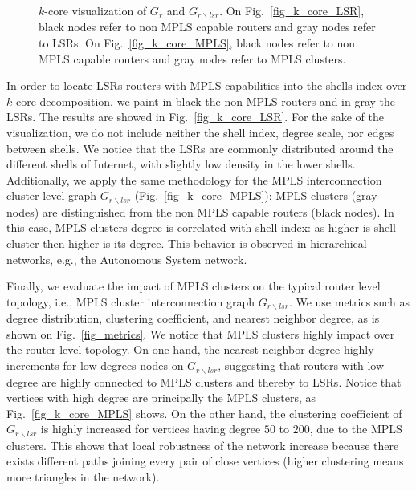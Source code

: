 \begin{figure*}[!t]
  \begin{center}
\hfil
  \end{center}
  \caption{$k$-core visualization of $G_r$ and $G_{r \backslash lsr}$.  On
  Fig.~\ref{fig_k_core_LSR}, black nodes refer to non MPLS capable routers and
  gray nodes refer to LSRs.  On Fig.~\ref{fig_k_core_MPLS}, black nodes refer to
  non MPLS capable routers and gray nodes refer to MPLS clusters.} 
  \label{fig_kcore_overview}
\end{figure*}

In order to locate LSRs-routers with MPLS capabilities into the shells index
over $k$-core decomposition, we paint in black the non-MPLS routers and in gray
the LSRs. The results are showed in Fig.~\ref{fig_k_core_LSR}.  For the sake of
the visualization, we do not include neither the shell index, degree scale, nor
edges between shells. 
We notice that the LSRs are commonly distributed around
the different shells of Internet, with slightly low density in the lower shells.  
Additionally, we apply the same methodology
for the MPLS interconnection cluster level graph $G_{r\backslash lsr}$
(Fig.~\ref{fig_k_core_MPLS}): MPLS clusters (gray nodes) are distinguished from
the non MPLS capable routers (black nodes). 
In this case,  MPLS clusters  degree is correlated with shell index: as higher is shell cluster then higher is its degree.
This behavior is observed in hierarchical networks, e.g., the Autonomous System network. 

Finally, we evaluate the impact of MPLS clusters on the typical router level
topology, i.e., MPLS cluster interconnection graph $G_{r \backslash lsr }$. We
use metrics such as degree distribution, clustering coefficient, and nearest
neighbor degree, as is shown on Fig.~\ref{fig_metrics}.
We notice that MPLS clusters highly impact over the router level topology. On
one hand, the nearest neighbor degree highly increments for low degrees nodes on
$G_{r \backslash lsr }$, suggesting that routers with low degree are highly
connected to MPLS clusters and thereby to LSRs. Notice that vertices with high degree are principally the MPLS clusters, as Fig.~\ref{fig_k_core_MPLS} shows.
On the other hand, the clustering coefficient of $G_{r \backslash lsr }$ is highly increased for vertices having degree $50$ to $200$, due to the MPLS clusters. 
This shows that local robustness of the network increase because there exists different paths joining every pair of close vertices (higher clustering means more triangles in the network). 

